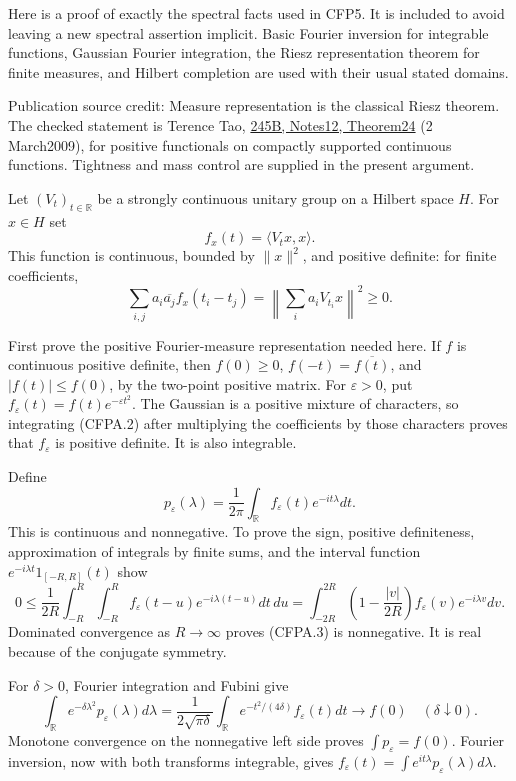 Here is a proof of exactly the spectral facts used in CFP5. It is
included to avoid leaving a new spectral assertion implicit. Basic
Fourier inversion for integrable functions, Gaussian Fourier
integration, the Riesz representation theorem for finite measures, and
Hilbert completion are used with their usual stated domains.

Publication source credit: Measure representation is the classical Riesz
theorem. The checked statement is Terence Tao,
\href{https://terrytao.wordpress.com/2009/03/02/245b-notes-12-continuous-functions-on-locally-compact-hausdorff-spaces/}{245B,
Notes12, Theorem24} (2 March2009), for positive functionals on compactly
supported continuous functions. Tightness and mass control are supplied
in the present argument.

Let \((V_t)_{t\in\mathbb R}\) be a strongly continuous unitary group on
a Hilbert space \(H\). For \(x\in H\) set \[
f_x(t)=\langle V_tx,x\rangle.
\tag{CFPA.1}
\] This function is continuous, bounded by \(\|x\|^2\), and positive
definite: for finite coefficients, \[
\sum_{i,j}a_i\overline{a_j}f_x(t_i-t_j)
=\left\|\sum_i a_iV_{t_i}x\right\|^2\ge0.
\tag{CFPA.2}
\]

First prove the positive Fourier-measure representation needed here. If
\(f\) is continuous positive definite, then \(f(0)\ge0\),
\(f(-t)=\overline{f(t)}\), and \(|f(t)|\le f(0)\), by the two-point
positive matrix. For \(\varepsilon>0\), put
\(f_\varepsilon(t)=f(t)e^{-\varepsilon t^2}\). The Gaussian is a
positive mixture of characters, so integrating (CFPA.2) after
multiplying the coefficients by those characters proves that
\(f_\varepsilon\) is positive definite. It is also integrable.

Define \[
p_\varepsilon(\lambda)=\frac1{2\pi}
\int_{\mathbb R}f_\varepsilon(t)e^{-it\lambda}dt.
\tag{CFPA.3}
\] This is continuous and nonnegative. To prove the sign, positive
definiteness, approximation of integrals by finite sums, and the
interval function \(e^{-i\lambda t}1_{[-R,R]}(t)\) show \[
0\le\frac1{2R}\int_{-R}^R\int_{-R}^R
f_\varepsilon(t-u)e^{-i\lambda(t-u)}dt\,du
=\int_{-2R}^{2R}
\left(1-\frac{|v|}{2R}\right)
f_\varepsilon(v)e^{-i\lambda v}dv.
\] Dominated convergence as \(R\to\infty\) proves (CFPA.3) is
nonnegative. It is real because of the conjugate symmetry.

For \(\delta>0\), Fourier integration and Fubini give \[
\int_{\mathbb R}e^{-\delta\lambda^2}p_\varepsilon(\lambda)d\lambda
=\frac1{2\sqrt{\pi\delta}}
\int_{\mathbb R}e^{-t^2/(4\delta)}f_\varepsilon(t)dt
\longrightarrow f(0)
\quad(\delta\downarrow0).
\tag{CFPA.4}
\] Monotone convergence on the nonnegative left side proves
\(\int p_\varepsilon=f(0)\). Fourier inversion, now with both transforms
integrable, gives
\(f_\varepsilon(t)=\int e^{it\lambda}p_\varepsilon(\lambda)d\lambda\).

